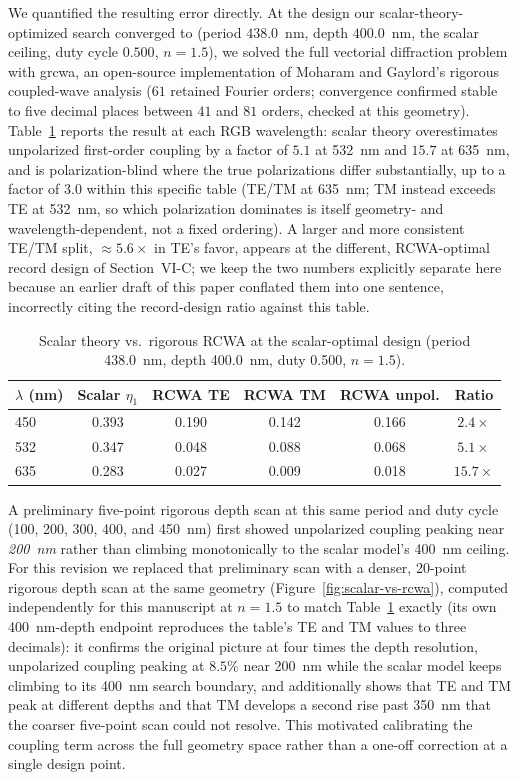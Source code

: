 \documentclass[10pt,twocolumn]{article}
\begin{document}
We quantified the resulting error directly. At the design our
scalar-theory-optimized search converged to (period $438.0$~nm, depth
$400.0$~nm, the scalar ceiling, duty cycle
$0.500$, $n=1.5$), we solved the full vectorial diffraction problem with
grcwa, an open-source implementation of Moharam and Gaylord's rigorous
coupled-wave analysis \cite{moharam1981,moharam1995a} ($61$ retained
Fourier orders; convergence confirmed stable to five decimal places between
$41$ and $81$ orders, checked at this geometry). Table~\ref{tab:scalar-vs-rcwa}
reports the result at each RGB wavelength: scalar theory overestimates
unpolarized first-order coupling by a factor of $5.1$ at 532~nm and $15.7$
at 635~nm, and is polarization-blind where the true polarizations differ
substantially, up to a factor of $3.0$ within this specific table (TE/TM
at 635~nm; TM instead exceeds TE at 532~nm, so which polarization dominates
is itself geometry- and wavelength-dependent, not a fixed ordering). A
larger and more consistent TE/TM split, $\approx5.6\times$ in TE's favor,
appears at the different, RCWA-optimal record design of Section~VI-C; we
keep the two numbers explicitly separate here because an earlier draft of
this paper conflated them into one sentence, incorrectly citing the
record-design ratio against this table.

\begin{table}[t]
\centering
\caption{Scalar theory vs.\ rigorous RCWA at the scalar-optimal design (period 438.0~nm, depth 400.0~nm, duty 0.500, $n=1.5$).}
\label{tab:scalar-vs-rcwa}
\footnotesize
\begin{tabular}{lccccc}
\toprule
$\lambda$ (nm) & Scalar $\eta_1$ & RCWA TE & RCWA TM & RCWA unpol. & Ratio \\
\midrule
450 & 0.393 & 0.190 & 0.142 & 0.166 & $2.4\times$ \\
532 & 0.347 & 0.048 & 0.088 & 0.068 & $5.1\times$ \\
635 & 0.283 & 0.027 & 0.009 & 0.018 & $15.7\times$ \\
\bottomrule
\end{tabular}
\end{table}

A preliminary five-point rigorous depth scan at this same period and duty
cycle (100, 200, 300, 400, and 450~nm) first showed unpolarized coupling
peaking near \emph{200~nm} rather than climbing monotonically to the
scalar model's 400~nm ceiling. For this revision we replaced that
preliminary scan with a denser, 20-point rigorous depth scan at the same
geometry (Figure~\ref{fig:scalar-vs-rcwa}), computed independently for
this manuscript at $n=1.5$ to match Table~\ref{tab:scalar-vs-rcwa} exactly
(its own 400~nm-depth endpoint reproduces the table's TE and TM values to
three decimals): it confirms the original picture at four times the depth
resolution, unpolarized coupling peaking at $8.5\%$ near 200~nm while the
scalar model keeps climbing to its 400~nm search boundary, and additionally
shows that TE and TM peak at different depths and that TM develops a second
rise past 350~nm that the coarser five-point scan could not resolve. This
motivated calibrating the coupling term across the full geometry space
rather than a one-off correction at a single design point.
\end{document}
